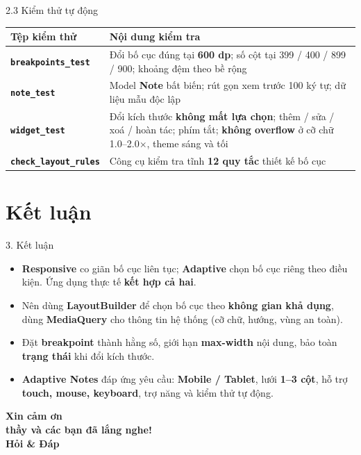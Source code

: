 \documentclass[aspectratio=169,10pt]{beamer}
\newcommand{\api}[1]{\texttt{\bfseries #1}}   %
\begin{document}
\begin{frame}{2.3 Kiểm thử tự động}
  \footnotesize
  \renewcommand{\arraystretch}{1.4}
  \centering
  \begin{tabular}{@{}>{\raggedright\arraybackslash}p{3.6cm}>{\raggedright\arraybackslash}p{8.9cm}@{}}
    \hline
    \rowcolor{cHead}\textbf{Tệp kiểm thử} & \textbf{Nội dung kiểm tra}\\ \hline
    \api{breakpoints\_test} & Đổi bố cục đúng tại \textbf{600 dp}; số cột tại 399 / 400 / 899 / 900; khoảng đệm theo bề rộng\\ \hline
    \api{note\_test} & Model \textbf{Note} bất biến; rút gọn xem trước 100 ký tự; dữ liệu mẫu độc lập\\ \hline
    \api{widget\_test} & Đổi kích thước \textbf{không mất lựa chọn}; thêm / sửa / xoá / hoàn tác; phím tắt; \textbf{không overflow} ở cỡ chữ 1.0--2.0$\times$, theme sáng và tối\\ \hline
    \api{check\_layout\_rules} & Công cụ kiểm tra tĩnh \textbf{12 quy tắc} thiết kế bố cục\\ \hline
  \end{tabular}
\end{frame}

\section{Kết luận}

\begin{frame}{3. Kết luận}
  \small
  \begin{itemize}\itemsep5pt
    \item \textbf{Responsive} co giãn bố cục liên tục; \textbf{Adaptive} chọn bố cục riêng theo điều kiện. Ứng dụng thực tế \textbf{kết hợp cả hai}.
    \item Nên dùng \textbf{LayoutBuilder} để chọn bố cục theo \textbf{không gian khả dụng}, dùng \textbf{MediaQuery} cho thông tin hệ thống (cỡ chữ, hướng, vùng an toàn).
    \item Đặt \textbf{breakpoint} thành hằng số, giới hạn \textbf{max-width} nội dung, bảo toàn \textbf{trạng thái} khi đổi kích thước.
    \item \textbf{Adaptive Notes} đáp ứng yêu cầu: \textbf{Mobile / Tablet}, lưới \textbf{1--3 cột}, hỗ trợ \textbf{touch, mouse, keyboard}, trợ năng và kiểm thử tự động.
  \end{itemize}
\end{frame}

\begin{frame}[plain]
  \centering
  \vspace{2.0cm}
  {\Huge\bfseries Xin cảm ơn\\[6pt] thầy và các bạn đã lắng nghe!}\\[16pt]
  {\Large\bfseries Hỏi \& Đáp}
\end{frame}
\end{document}
